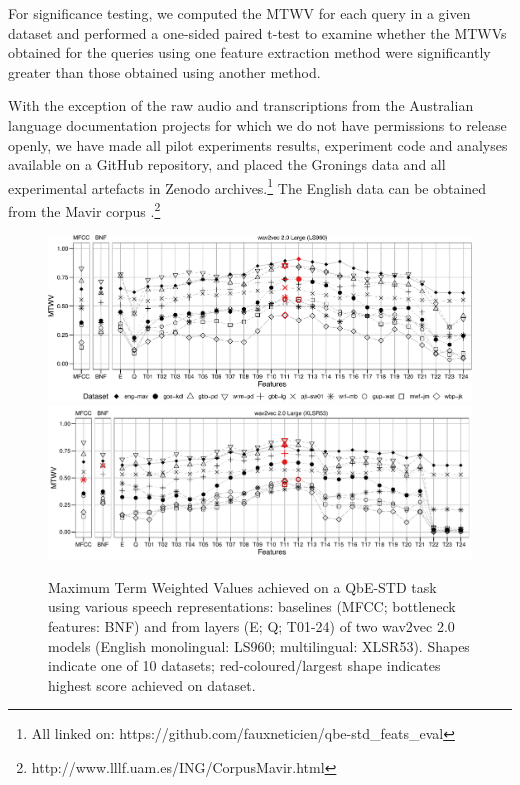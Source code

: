 \documentclass{article}
\begin{document}
For significance testing, we computed the MTWV for each query in a given dataset and performed a one-sided paired t-test to examine whether the MTWVs obtained for the queries using one feature extraction method were significantly greater than those obtained using another method.

With the exception of the raw audio and transcriptions from the Australian language documentation projects for which we do not have permissions to release openly, we have made all pilot experiments results, experiment code and analyses available on a GitHub repository, and placed the Gronings data and all experimental artefacts in Zenodo archives.\footnote{All linked on: https://github.com/fauxneticien/qbe-std\_feats\_eval\label{ghlink}}
The English data can be obtained from the Mavir corpus \cite{sandoval2012mavir}.\footnote{http://www.lllf.uam.es/ING/CorpusMavir.html}

\begin{figure}[ht!]
  \centering
  \includegraphics[width=0.97\linewidth]{MTWV-LS960.pdf}
  \includegraphics[width=0.97\linewidth]{MTWV-XLSR53.pdf}
  \caption{Maximum Term Weighted Values achieved on a QbE-STD task using various speech representations: baselines (MFCC; bottleneck features: BNF) and from layers (E; Q; T01-24) of two wav2vec 2.0 models (English monolingual: LS960; multilingual: XLSR53). Shapes indicate one of 10 datasets; red-coloured/largest shape indicates highest score achieved on dataset.}
  \label{fig:mtwv}
\end{figure}
\end{document}
